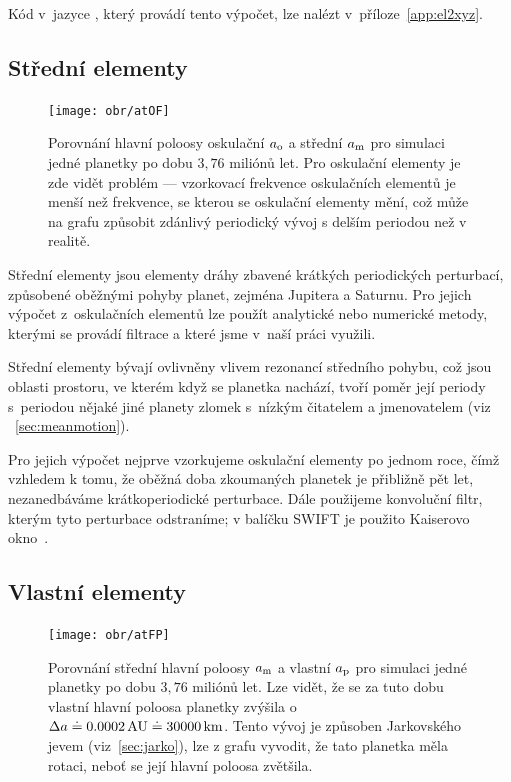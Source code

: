 \documentclass[A4paper, 12pt, oneside]{book}
\begin{document}
Kód v~jazyce , který provádí tento výpočet, lze nalézt v~příloze~\ref{app:el2xyz}.

\subsection{Střední elementy}

\begin{figure}
	\centering
	\texttt{[image: obr/atOF]}
	\caption{Porovnání hlavní poloosy oskulační $a_{\rm o}$ a střední $a_{\rm m}$ pro simulaci jedné planetky po dobu $3,76$ miliónů let. Pro oskulační elementy je zde vidět problém  --- vzorkovací frekvence oskulačních elementů je menší než frekvence, se kterou se oskulační elementy mění, což může na grafu způsobit zdánlivý periodický vývoj s delším periodou než v realitě.} 
	\label{atOF}
\end{figure}

Střední elementy jsou elementy dráhy zbavené krátkých periodických perturbací, způsobené oběžnými pohyby planet, zejména Jupitera a Saturnu. Pro jejich výpočet z~oskulačních elementů lze použít analytické nebo numerické metody, kterými se provádí filtrace a které jsme v~naší práci využili. 

Střední elementy bývají ovlivněny vlivem rezonancí středního pohybu, což jsou oblasti prostoru, ve kterém když se planetka nachází, tvoří poměr její periody s~periodou nějaké jiné planety zlomek s~nízkým čitatelem a jmenovatelem (viz ~\ref{sec:meanmotion}). 

Pro jejich výpočet nejprve vzorkujeme oskulační elementy po jednom roce, čímž vzhledem k tomu, že oběžná doba zkoumaných planetek je přibližně pět let, nezanedbáváme krátkoperiodické perturbace. Dále použijeme konvoluční filtr, kterým tyto perturbace odstraníme; v balíčku SWIFT je použito Kaiserovo okno~\cite{quinn91}.

\subsection{Vlastní elementy}

\begin{figure}
	\centering
	\texttt{[image: obr/atFP]}
	\caption{Porovnání střední hlavní poloosy $a_{\rm m}$ a vlastní $a_{\rm p}$ pro simulaci jedné planetky po dobu $3,76$ miliónů let. Lze vidět, že se za tuto dobu vlastní hlavní poloosa planetky zvýšila o~$\Delta a\doteq0.0002\,{\rm AU}\doteq30000\, {\rm km}$. Tento vývoj je způsoben Jarkovského jevem (viz~\ref{sec:jarko}), lze z grafu vyvodit, že tato planetka měla  rotaci, neboť se její hlavní poloosa zvětšila.}
	\label{atFP}
\end{figure}
\end{document}

